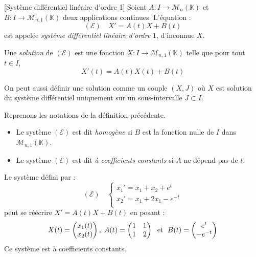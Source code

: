 \documentclass[french,11pt,twoside]{VcCours}
\begin{document}
\begin{Definition}{}[Système différentiel linéaire d'ordre 1] Soient $A : I \rightarrow \mathcal{M}_n(\mathbb{K})$ et $B : I \rightarrow \mathcal{M}_{n,1}(\mathbb{K})$ deux applications continues. L'équation :
$$ (\mathcal{E}) \quad X'=A(t)X+B(t)$$
est appelée \emph{système différentiel linéaire d'ordre} $1$, d'inconnue $X$.

Une \emph{solution} de $(\mathcal{E})$ est une fonction $X : I \rightarrow \mathcal{M}_{n,1}(\mathbb{K})$ telle que pour tout $t \in I$,
$$ X'(t) = A(t) X(t) + B(t)$$
\end{Definition}

\begin{Remarque}{}
On peut aussi définir une solution comme un couple $(X,J)$ où $X$ est solution du système différentiel uniquement sur un sous-intervalle $J \subset I$.
\end{Remarque}

\begin{Definition}{} Reprenons les notations de la définition précédente.

\begin{itemize}
\item Le système $(\mathcal{E})$ est dit \emph{homogène} si $B$ est la fonction nulle de $I$ dans $\mathcal{M}_{n,1}(\mathbb{K})$.
\item Le système $(\mathcal{E})$ est dit \emph{à coefficients constants} si $A$ ne dépend pas de $t$.
\end{itemize}
\end{Definition}

\begin{Exemple} Le système défini par :
$$ (\mathcal{E}) \quad \left\lbrace \begin{array}{lcl}
x_1'=x_1+x_2 + e^t \\
x_2'=x_1+2x_1 - e^{-t} \\
\end{array}\right.$$
peut se réécrire $X'=A(t)X+B(t)$ en posant :
$$ X(t) = \begin{pmatrix}
x_1(t) \\
x_2(t) \\
\end{pmatrix}, \; A(t) = \begin{pmatrix}
1 & 1 \\
1 & 2 \\
\end{pmatrix} \; \hbox{ et } \; B(t) = \begin{pmatrix}
e^t \\
-e^{-t} \\
\end{pmatrix}$$
Ce système est à coefficients constants.
\end{Exemple}
\end{document}
